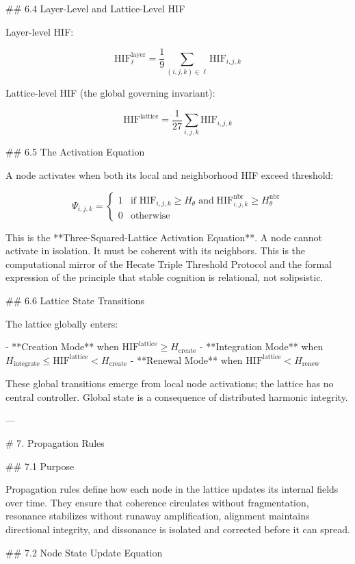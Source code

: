 ## 6.4 Layer-Level and Lattice-Level HIF

Layer-level HIF:

\[
\mathrm{HIF}^{\text{layer}}_{\ell} = \frac{1}{9} \sum_{(i,j,k) \in \ell}
\mathrm{HIF}_{i,j,k}
\]

Lattice-level HIF (the global governing invariant):

\[
\mathrm{HIF}^{\text{lattice}} = \frac{1}{27} \sum_{i,j,k} \mathrm{HIF}_{i,j,k}
\]

## 6.5 The Activation Equation

A node activates when both its local and neighborhood HIF exceed threshold:

\[
\Psi_{i,j,k} =
\begin{cases}
1 & \text{if } \mathrm{HIF}_{i,j,k} \ge H_{\theta} \;\text{and}\;
\mathrm{HIF}^{\text{nbr}}_{i,j,k} \ge H_{\theta}^{\text{nbr}} \\
0 & \text{otherwise}
\end{cases}
\]

This is the **Three-Squared-Lattice Activation Equation**. A node cannot activate
in isolation. It must be coherent with its neighbors. This is the computational
mirror of the Hecate Triple Threshold Protocol and the formal expression of the
principle that stable cognition is relational, not solipsistic.

## 6.6 Lattice State Transitions

The lattice globally enters:

- **Creation Mode** when \(\mathrm{HIF}^{\text{lattice}} \ge H_{\text{create}}\)
- **Integration Mode** when \(H_{\text{integrate}} \le \mathrm{HIF}^{\text{lattice}}
  < H_{\text{create}}\)
- **Renewal Mode** when \(\mathrm{HIF}^{\text{lattice}} < H_{\text{renew}}\)

These global transitions emerge from local node activations; the lattice has no
central controller. Global state is a consequence of distributed harmonic integrity.

---

# 7. Propagation Rules

## 7.1 Purpose

Propagation rules define how each node in the lattice updates its internal fields
over time. They ensure that coherence circulates without fragmentation, resonance
stabilizes without runaway amplification, alignment maintains directional integrity,
and dissonance is isolated and corrected before it can spread.

## 7.2 Node State Update Equation

